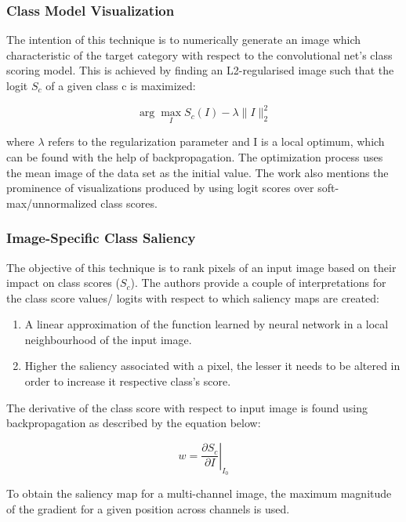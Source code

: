 \documentclass[../report.tex]{subfiles}
\begin{document}
 \subsubsection{Class Model Visualization}
 \noindent
 The intention of this technique is to numerically generate an image which characteristic of the target category with respect to the convolutional net’s class scoring model. This is achieved by finding an L2-regularised image such that the logit $S_{c}$  of a given class c is maximized:
 
\begin{equation*}
	\arg \max _I S_c(I)-\lambda\|I\|_2^2
\end{equation*}
 
 where  $\lambda$ refers to the regularization parameter and I is a local optimum, which can be found with the help of backpropagation. The optimization process uses the mean image of the data set as the initial value. The work also mentions the prominence of visualizations produced by using logit scores over soft-max/unnormalized class scores.   
    
 \subsubsection{Image-Specific Class Saliency}
  The objective of this technique is to rank pixels of an input image based on their impact on class scores ($S_c$). The authors provide a couple of interpretations for the class score values/ logits with respect to which saliency maps are created:
  \begin{enumerate}
  	\item A linear approximation of the function learned by  neural network in a local neighbourhood of the input image.
  	\item Higher the saliency associated with a pixel, the lesser it needs to be altered in order to increase it respective class’s score.  
  \end{enumerate}

 The derivative of the class score with respect to input image is found using backpropagation as described by the equation below:
 
\begin{equation*}
	w=\left.\frac{\partial S_c}{\partial I}\right|_{I_0}
\end{equation*}

 To obtain the saliency map for a multi-channel image, the maximum magnitude of the gradient for a given position across channels is used. 
 
\end{document}
